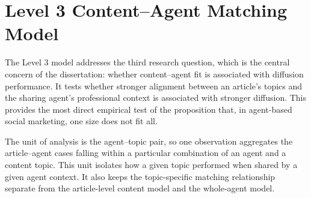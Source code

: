 \section{Level 3 Content–Agent Matching Model}
\label{sec:5-3-level-3-content-agent-matching-model}

The Level 3 model addresses the third research question, which is the central concern of the dissertation: whether content–agent fit is associated with diffusion performance. It tests whether stronger alignment between an article's topics and the sharing agent's professional context is associated with stronger diffusion. This provides the most direct empirical test of the proposition that, in agent-based social marketing, one size does not fit all.

The unit of analysis is the agent–topic pair, so one observation aggregates the article–agent cases falling within a particular combination of an agent and a content topic. This unit isolates how a given topic performed when shared by a given agent context. It also keeps the topic-specific matching relationship separate from the article-level content model and the whole-agent model.

